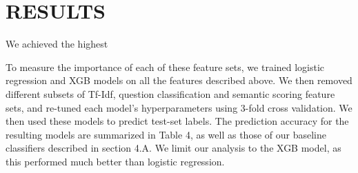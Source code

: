 \documentclass[letterpaper, 10 pt, conference]{ieeeconf}  %
\begin{document}
\section{RESULTS}

We achieved the highest 


To measure the importance of each of these feature sets, we trained logistic regression and XGB models on all the features described above. We then removed different subsets of Tf-Idf, question classification and semantic scoring feature sets, and re-tuned each model's hyperparameters using 3-fold cross validation. We then used these models to predict test-set labels. The prediction accuracy for the resulting models are summarized in Table 4, as well as those of our baseline classifiers described in section 4.A. We limit our analysis to the XGB model, as this performed much better than logistic regression. 
\end{document}
